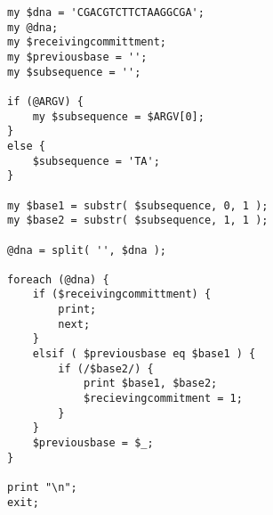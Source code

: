\documentclass{TIJMUjiaoanSY}
\begin{document}
\begin{enumerate}
\begin{enumerate}
\begin{verbatim}
my $dna = 'CGACGTCTTCTAAGGCGA';
my @dna;
my $receivingcommittment;
my $previousbase = '';
my $subsequence = '';

if (@ARGV) {
    my $subsequence = $ARGV[0];
}
else {
    $subsequence = 'TA';
}

my $base1 = substr( $subsequence, 0, 1 );
my $base2 = substr( $subsequence, 1, 1 );

@dna = split( '', $dna );

foreach (@dna) {
    if ($receivingcommittment) {
        print;
        next;
    }
    elsif ( $previousbase eq $base1 ) {
        if (/$base2/) {
            print $base1, $base2;
            $recievingcommitment = 1;
        }
    }
    $previousbase = $_;
}

print "\n";
exit;
\end{verbatim}
    \end{enumerate}
\end{enumerate}

\otherTail
\end{document}
